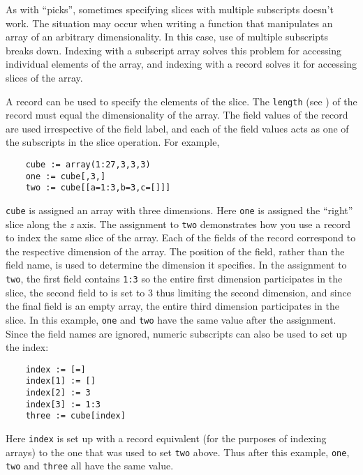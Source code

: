 As with ``picks'', sometimes specifying slices with multiple
subscripts doesn't work. The situation may 
occur when writing a function that manipulates an array of an
arbitrary dimensionality. In this case, use of multiple subscripts breaks
down. Indexing with a subscript array solves this problem for
accessing individual elements of the array, and indexing with a
record solves it for accessing slices of the array.

A record can be used to specify the elements of the slice. The {\tt length}
(see ) of the record must equal the dimensionality of
the array. The field values of the record are used irrespective of the
field label, and each of the field values acts as one of the subscripts
in the slice operation. For example,
\begin{verbatim}
    cube := array(1:27,3,3,3)
    one := cube[,3,]
    two := cube[[a=1:3,b=3,c=[]]]
\end{verbatim}
{\tt cube} is assigned an array with three dimensions. Here {\tt one} is
assigned the ``right'' slice along the {\em z} axis. The assignment to
{\tt two} demonstrates how
you  use a record to index the same slice of the array. Each of
the fields of the record correspond to the respective dimension of
the array. The position of the field, rather than the field name, is
used to determine the dimension it specifies. In the assignment
to {\tt two}, the first field contains {\tt 1:3} so the entire first
dimension participates in the slice, the second field to is set to 3 thus
limiting the second dimension, and since the final field is an empty array,
the entire third dimension participates in the slice. In this example,
{\tt one} and {\tt two}
have the same value after the  assignment. Since the field names are ignored,
numeric subscripts can also be used to set up the index:
\begin{verbatim}
    index := [=]
    index[1] := []
    index[2] := 3
    index[3] := 1:3
    three := cube[index]
\end{verbatim}
Here {\tt index} is set up with a record equivalent (for the purposes
of indexing arrays) to the one that was used to set {\tt two} above. Thus after this
example, {\tt one}, {\tt two} and {\tt three} all have the same value.

